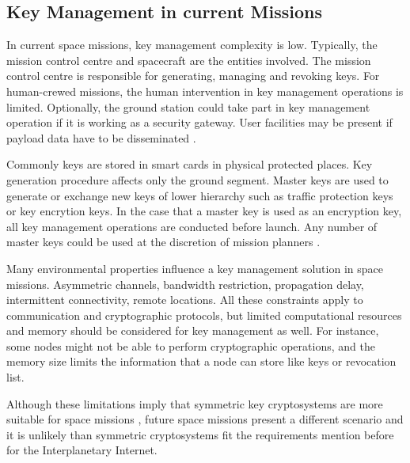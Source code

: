  



\subsection{Key Management in current Missions}

In current space missions, key management complexity is low.  Typically, the mission control centre and spacecraft are the entities involved. The mission control centre is responsible for generating, managing and revoking keys. For human-crewed missions, the human intervention in key management operations is limited. Optionally, the ground station could take part in key management operation if it is working as a security gateway.  User facilities may be present if payload data have to be disseminated \cite{book2011space}. 


Commonly keys are stored in smart cards in physical protected places. Key generation procedure affects only the ground segment. Master keys are used to generate or exchange new keys of lower hierarchy such as traffic protection keys or key encrytion keys. In the case that a master key is used as an encryption key, all key management operations are conducted before launch. Any number of master keys could be used at the discretion of mission planners \cite{book2011space}.

Many environmental properties influence a key management solution in space missions. Asymmetric channels, bandwidth restriction, propagation delay, intermittent connectivity, remote locations. All these constraints apply to communication and cryptographic protocols, but limited computational resources and memory should be considered for key management as well. For instance, some nodes might not be able to perform cryptographic operations, and the memory size limits the information that a node can store like keys or revocation list.

Although these limitations imply that symmetric key cryptosystems are more suitable for space missions \cite{book2011space}, future space missions present a different scenario and it is unlikely than symmetric cryptosystems fit the requirements mention before for the Interplanetary Internet.


